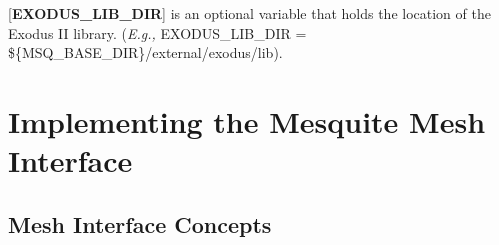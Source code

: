   [{\bf EXODUS\_LIB\_DIR}] is an optional variable that holds the location of the Exodus II library. 
({\it E.g.,} EXODUS\_LIB\_DIR = \$\{MSQ\_BASE\_DIR\}/external/exodus/lib).

\section{Implementing the Mesquite Mesh Interface} \label{sec:msq_mesh}

%
%

\subsection{Mesh Interface Concepts}

